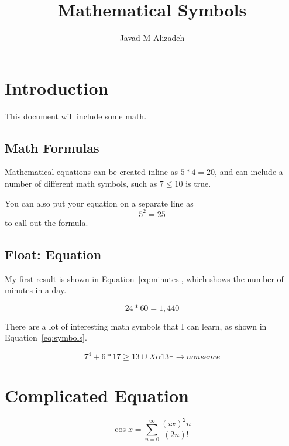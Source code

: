 \documentclass{article}
\title{Mathematical Symbols}
\author{Javad M Alizadeh}
\date{}
\begin{document}
\maketitle
	
\section{Introduction}

This document will include some math.


\subsection{Math Formulas}
	

Mathematical equations can be created inline as $5*4=20$, and can include a number of different math symbols, such as $7\leq 10$ is true.

You can also put your equation on a separate line as \[5^2=25\] to call out the formula.

\subsection{Float: Equation}

My first result is shown in Equation~\ref{eq:minutes}, which shows the number of minutes in a day.

\begin{equation}
	24*60 = 1,440
	\label{eq:minutes}
\end{equation}

\noindent There are a lot of interesting math symbols that I can learn, as shown in Equation~\ref{eq:symbols}.

\begin{equation}
	7^4+6*17 \geq 13 \cup X \alpha 13 \exists \rightarrow nonsence
	\label{eq:symbols}
\end{equation}
	
\section{Complicated Equation}

\begin{equation}
	\cos x = {\sum}_{n=0}^{\infty}\frac{(ix)^2n}{(2n)!}
\end{equation}	
	
\end{document}
